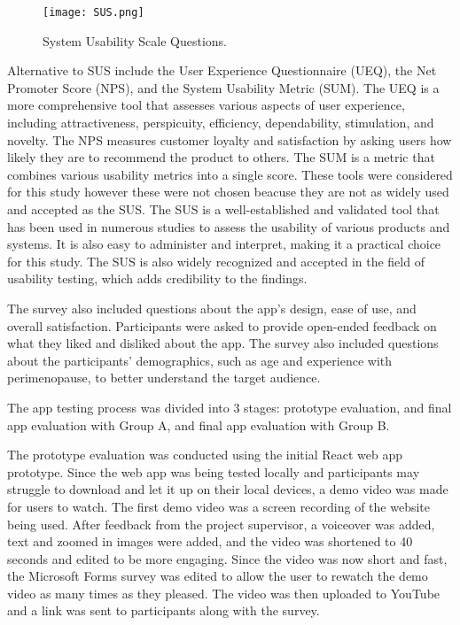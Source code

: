 \begin{figure}[h!!]
  \begin{center}
    \texttt{[image: SUS.png]}
    \caption{System Usability Scale Questions.}
    \label{figure:sus}
  \end{center}
\end{figure}

Alternative to SUS include the User Experience Questionnaire (UEQ), the Net Promoter Score (NPS), and the System Usability Metric (SUM). The UEQ is a more comprehensive tool that assesses various aspects of user experience, including attractiveness, perspicuity, efficiency, dependability, stimulation, and novelty. The NPS measures customer loyalty and satisfaction by asking users how likely they are to recommend the product to others. The SUM is a metric that combines various usability metrics into a single score. These tools were considered for this study however these were not chosen beacuse they are not as widely used and accepted as the SUS. The SUS is a well-established and validated tool that has been used in numerous studies to assess the usability of various products and systems. It is also easy to administer and interpret, making it a practical choice for this study. The SUS is also widely recognized and accepted in the field of usability testing, which adds credibility to the findings.

The survey also included questions about the app's design, ease of use, and overall satisfaction. Participants were asked to provide open-ended feedback on what they liked and disliked about the app. The survey also included questions about the participants' demographics, such as age and experience with perimenopause, to better understand the target audience.

The app testing process was divided into 3 stages: prototype evaluation, and final app evaluation with Group A, and final app evaluation with Group B. 

The prototype evaluation was conducted using the initial React web app prototype. Since the web app was being tested locally and participants may struggle to download and let it up on their local devices, a demo video was made for users to watch. The first demo video was a screen recording of the website being used. After feedback from the project supervisor, a voiceover was added, text and zoomed in images were added, and the video was shortened to 40 seconds and edited to be more engaging. Since the video was now short and fast, the Microsoft Forms survey was edited to allow the user to rewatch the demo video as many times as they pleased. The video was then uploaded to YouTube and a link was sent to participants along with the survey. 


